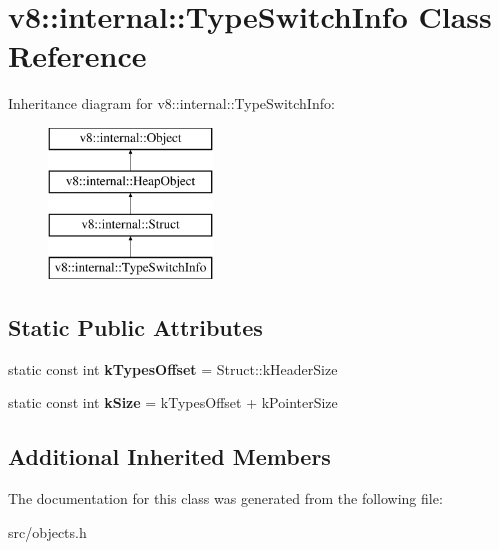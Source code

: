 \hypertarget{classv8_1_1internal_1_1_type_switch_info}{}\section{v8\+:\+:internal\+:\+:Type\+Switch\+Info Class Reference}
\label{classv8_1_1internal_1_1_type_switch_info}
Inheritance diagram for v8\+:\+:internal\+:\+:Type\+Switch\+Info\+:\begin{figure}[H]
\begin{center}
\leavevmode
\includegraphics[height=4.000000cm]{classv8_1_1internal_1_1_type_switch_info}
\end{center}
\end{figure}
\subsection*{Static Public Attributes}
\begin{DoxyCompactItemize}
\item 
\hypertarget{classv8_1_1internal_1_1_type_switch_info_a14c1fbe927f94dc25dd5f9d0c23d025e}{}static const int {\bfseries k\+Types\+Offset} = Struct\+::k\+Header\+Size\label{classv8_1_1internal_1_1_type_switch_info_a14c1fbe927f94dc25dd5f9d0c23d025e}

\item 
\hypertarget{classv8_1_1internal_1_1_type_switch_info_a970b63a29b0028855a2665245a216a41}{}static const int {\bfseries k\+Size} = k\+Types\+Offset + k\+Pointer\+Size\label{classv8_1_1internal_1_1_type_switch_info_a970b63a29b0028855a2665245a216a41}

\end{DoxyCompactItemize}
\subsection*{Additional Inherited Members}


The documentation for this class was generated from the following file\+:\begin{DoxyCompactItemize}
\item 
src/objects.\+h\end{DoxyCompactItemize}

